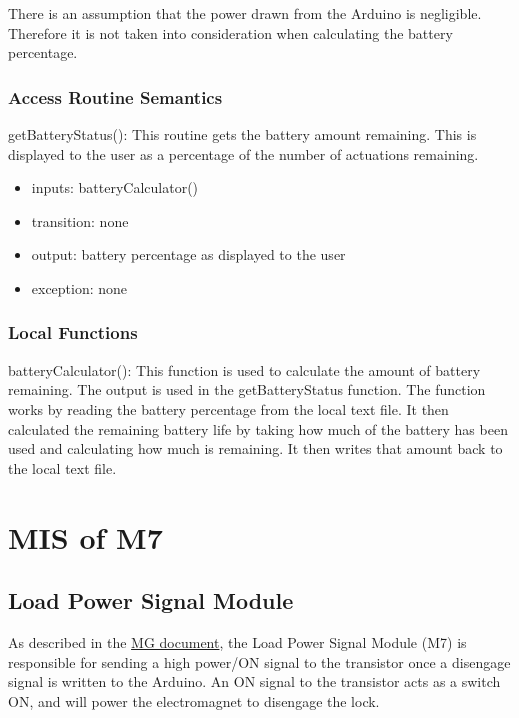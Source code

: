 \documentclass[12pt, titlepage]{article}
\begin{document}
There is an assumption that the power drawn from the Arduino is negligible. Therefore it is not taken into consideration when calculating the battery percentage. 

\subsubsection{Access Routine Semantics}

\noindent getBatteryStatus():
This routine gets the battery amount remaining. This is displayed to the user as a percentage of the number of actuations remaining. 
\begin{itemize}
\item inputs: batteryCalculator()
\item transition: none
\item output: battery percentage as displayed to the user
\item exception: none
\end{itemize}

\subsubsection{Local Functions}

\noindent batteryCalculator():
This function is used to calculate the amount of battery remaining. The output is used in the getBatteryStatus function. The function works by reading the battery percentage from the local text file. It then calculated the remaining battery life by taking how much of the battery has been used and calculating how much is remaining. It then writes that amount back to the local text file. 




\section{MIS of M7  \label{LoadPowerSignal}}

\subsection{Load Power Signal Module}

As described in the \href{https://github.com/NevoAbigail/Capstone/blob/main/docs/Design/SoftArchitecture/MG.pdf}{MG document}, the Load Power Signal Module (M7) is responsible for sending a high power/ON signal to the transistor once a disengage signal is written to the Arduino. An ON signal to the transistor acts as a switch ON, and will power the electromagnet to disengage the lock. 
\end{document}
